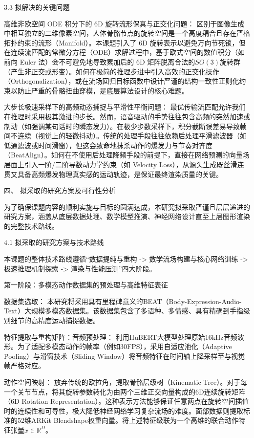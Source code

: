 \documentclass[UTF8]{ctexart}
\begin{document}
3.3 拟解决的关键问题

高维非欧空间 ODE 积分下的 6D 旋转流形保真与正交化问题：
区别于图像生成中相互独立的二维像素空间，人体骨骼节点的旋转空间是一个高度耦合且存在严格拓扑约束的流形（Manifold）。本课题引入了
6D
旋转表示以避免万向节死锁，但在连续流匹配的常微分方程（ODE）求解过程中，基于欧式空间的数值积分（如前向
Euler 法）会不可避免地导致累加后的 6D
矩阵脱离合法的\(SO(3)\)旋转群（产生非正交或形变）。如何在极简的推理步进中引入高效的正交化操作（Orthogonalization），或在流场回归目标函数中设计严谨的结构一致性正则化约束以防止严重的骨骼扭曲穿模，是底层算法设计的核心难题。

大步长极速采样下的高频动态捕捉与平滑性平衡问题：
最优传输流匹配允许我们在推理时采用极其激进的步长。然而，语音驱动的手势往往包含高频的突然加速或制动（如强调某句话时的瞬态发力）。在极少步数采样下，积分截断误差易导致帧间不连续（视觉上的轻微抖动）。传统的处理手段往往依赖后处理平滑滤波器（如低通滤波或时间滑窗），但这会致命地抹杀动作的爆发力与节奏对齐度（BeatAlign）。如何在不使用后处理降频手段的前提下，直接在网络预测的向量场层面上引入一阶/二阶导数动力学约束（如
Velocity
Loss），从源头生成既丝滑连贯又具备高频爆发物理真实感的运动轨迹，是保证最终渲染质量的关键。

四、 拟采取的研究方案及可行性分析

为了确保课题内容的顺利实施与目标的圆满达成，本研究拟采取严谨且层层递进的研究方案，涵盖从底层数据处理、数学模型推演、神经网络设计直至上层图形渲染的完整技术路线。

4.1 拟采取的研究方案与技术路线

本课题的整体技术路线遵循``数据提纯与重构 -\textgreater{}
数学流场构建与核心网络训练 -\textgreater{} 极速推理机制探索
-\textgreater{} 渲染与性能压测''四大阶段。

第一阶段：多模态动作数据集的预处理与高维特征表征

数据集选取：
本研究将采用具有里程碑意义的BEAT（Body-Expression-Audio-Text）大规模多模态数据集。该数据集包含了多语种、多情感、具有精确到手指级别细节的高精度运动捕捉数据。

特征提取与重构矩阵：音频预处理：
利用HuBERT大模型处理原始16kHz音频波形。为了适配多模态动作的帧率（例如30FPS），采用自适应池化（Adaptive
Pooling）与滑窗技术（Sliding
Window）将音频特征在时间轴上降采样至与视觉帧严格对应。

动作空间映射： 放弃传统的欧拉角，提取骨骼层级树（Kinematic
Tree）。对于每一个关节节点，将其旋转参数转化为由两个三维正交向量构成的6D连续旋转矩阵（6D
Rotation
Representation）。这种表示方法能够保证任意两点在旋转空间插值时的连续性和可导性，极大降低神经网络学习复杂流场的难度。面部数据则提取标准的52维ARKit
Blendshape权重向量。将上述特征级联为一个高维的联合动作特征张量\(x \in \mathbb{R}^{D}\)。
\end{document}
